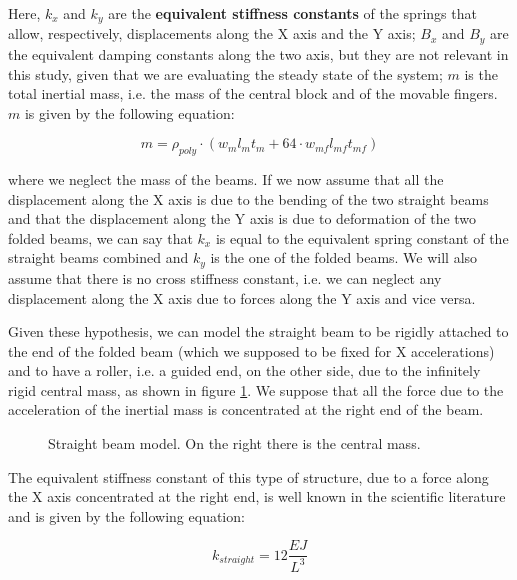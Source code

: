 \documentclass[lettersize,journal]{IEEEtran}
\begin{document}
        Here, \(k_x\) and \(k_y\) are the \textbf{equivalent stiffness constants} of the springs that allow, respectively, displacements along the X axis and the Y axis; \(B_x\) and \(B_y\) are the equivalent damping constants along the two axis, but they are not relevant in this study, given that we are evaluating the steady state of the system; \(m\) is the total inertial mass, i.e. the mass of the central block and of the movable fingers. \(m\) is given by the following equation:
        
        \begin{equation}\label{eq:mass}
            m=\rho_{poly} \cdot (w_m l_m t_m + 64\cdot w_{mf} l_{mf} t_{mf})
        \end{equation}
        
        where we neglect the mass of the beams.
        If we now assume that all the displacement along the X axis is due to the bending of the two straight beams and that the displacement along the Y axis is due to deformation of the two folded beams, we can say that \(k_x\) is equal to the equivalent spring constant of the straight beams combined and \(k_y\) is the one of the folded beams. We will also assume that there is no cross stiffness constant, i.e. we can neglect any displacement along the X axis due to forces along the Y axis and vice versa.
        
        Given these hypothesis, we can model the straight beam to be rigidly attached to the end of the folded beam (which we supposed to be fixed for X accelerations) and to have a roller, i.e. a guided end, on the other side, due to the infinitely rigid central mass, as shown in figure \ref{fig:straight_beam_model}. We suppose that all the force due to the acceleration of the inertial mass is concentrated at the right end of the beam.
        
        \begin{figure}[!h]
            \centering
            
            \caption{Straight beam model. On the right there is the central mass.}
            \label{fig:straight_beam_model}
        \end{figure}
        
        The equivalent stiffness constant of this type of structure, due to a force along the X axis concentrated at the right end, is well known in the scientific literature and is given by the following equation:
        
        \begin{equation}\label{eq:straight_beam_k_symbol}
            k_{straight} = 12\frac{EJ}{L^3}
        \end{equation}
        
\end{document}
